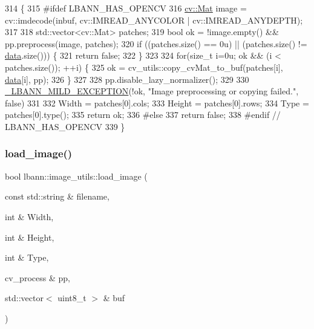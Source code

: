 \begin{DoxyCode}
314                                                                                                            
                   \{
315 \textcolor{preprocessor}{#ifdef LBANN\_HAS\_OPENCV}
316   \hyperlink{base_8hpp_a68f11fdc31b62516cb310831bbe54d73}{cv::Mat} image = cv::imdecode(inbuf, cv::IMREAD\_ANYCOLOR | cv::IMREAD\_ANYDEPTH);
317 
318   std::vector<cv::Mat> patches;
319   \textcolor{keywordtype}{bool} ok = !image.empty() && pp.preprocess(image, patches);
320   \textcolor{keywordflow}{if} ((patches.size() == 0u) || (patches.size() != \hyperlink{namespacelbann_1_1cnpy__utils_a9ac86d96ccb1f8b4b2ea16441738781f}{data}.size())) \{
321     \textcolor{keywordflow}{return} \textcolor{keyword}{false};
322   \}
323 
324   \textcolor{keywordflow}{for}(\textcolor{keywordtype}{size\_t} i=0u; ok && (i < patches.size()); ++i) \{
325     ok = cv\_utils::copy\_cvMat\_to\_buf(patches[i], \hyperlink{namespacelbann_1_1cnpy__utils_a9ac86d96ccb1f8b4b2ea16441738781f}{data}[i], pp);
326   \}
327 
328   pp.disable\_lazy\_normalizer();
329 
330   \hyperlink{mild__exception_8hpp_a7b8339c566152ab29ce66b63e90c67f9}{\_LBANN\_MILD\_EXCEPTION}(!ok, \textcolor{stringliteral}{"Image preprocessing or copying failed."}, \textcolor{keyword}{false})
331 
332   Width  = patches[0].cols;
333   Height = patches[0].rows;
334   Type   = patches[0].type();
335   return ok;
336 \textcolor{preprocessor}{#else}
337   \textcolor{keywordflow}{return} \textcolor{keyword}{false};
338 \textcolor{preprocessor}{#endif // LBANN\_HAS\_OPENCV}
339 \}
\end{DoxyCode}
\mbox{\label{classlbann_1_1image__utils_ac324a04f877601387cfb10750f1f6b8d}} 
\subsubsection{\texorpdfstring{load\+\_\+image()}{load\_image()}\hspace{0.1cm}{\footnotesize\ttfamily [1/5]}}
{\footnotesize\ttfamily bool lbann\+::image\+\_\+utils\+::load\+\_\+image (\begin{DoxyParamCaption}\item[{const std\+::string \&}]{filename,  }\item[{int \&}]{Width,  }\item[{int \&}]{Height,  }\item[{int \&}]{Type,  }\item[{cv\+\_\+process \&}]{pp,  }\item[{std\+::vector$<$ uint8\+\_\+t $>$ \&}]{buf }\end{DoxyParamCaption})\hspace{0.3cm}{\ttfamily [static]}}



